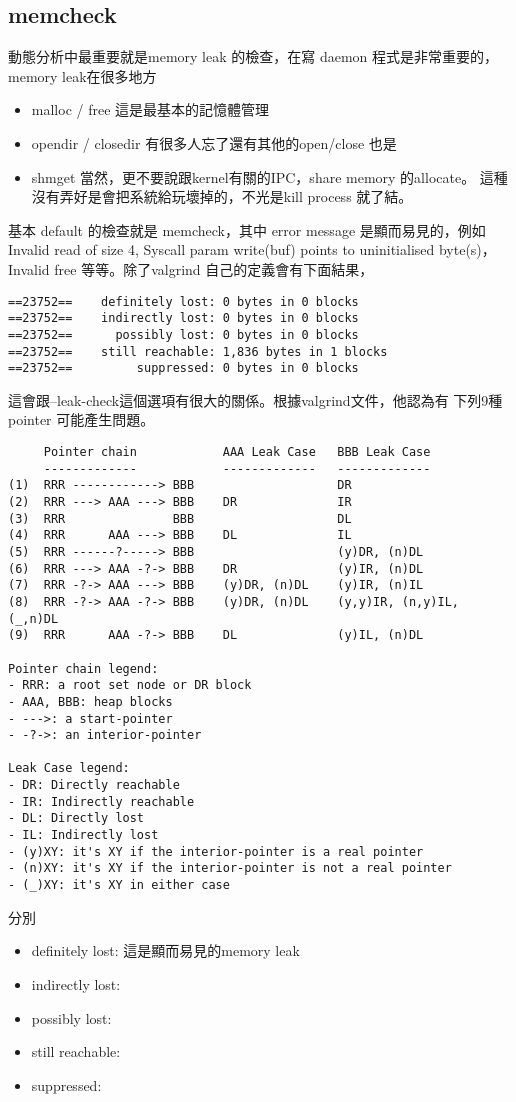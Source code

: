     \subsection{memcheck}
    動態分析中最重要就是memory leak 的檢查，在寫 daemon 程式是非常重要的，
    memory leak在很多地方
    \begin{itemize}
      \item malloc / free 這是最基本的記憶體管理
      \item opendir / closedir 有很多人忘了還有其他的open/close 也是
      \item shmget 當然，更不要說跟kernel有關的IPC，share memory 的allocate。
        這種沒有弄好是會把系統給玩壞掉的，不光是kill process 就了結。
    \end{itemize}
    基本 default 的檢查就是 memcheck，其中 error message 是顯而易見的，例如
    Invalid read of size 4, Syscall param write(buf) points to uninitialised
    byte(s)，Invalid free 等等。除了valgrind 自己的定義會有下面結果，
    \begin{verbatim}
==23752==    definitely lost: 0 bytes in 0 blocks
==23752==    indirectly lost: 0 bytes in 0 blocks
==23752==      possibly lost: 0 bytes in 0 blocks
==23752==    still reachable: 1,836 bytes in 1 blocks
==23752==         suppressed: 0 bytes in 0 blocks
    \end{verbatim}
    這會跟--leak-check這個選項有很大的關係。根據valgrind文件，他認為有
    下列9種pointer 可能產生問題。
    \begin{verbatim}
     Pointer chain            AAA Leak Case   BBB Leak Case
     -------------            -------------   -------------
(1)  RRR ------------> BBB                    DR
(2)  RRR ---> AAA ---> BBB    DR              IR
(3)  RRR               BBB                    DL
(4)  RRR      AAA ---> BBB    DL              IL
(5)  RRR ------?-----> BBB                    (y)DR, (n)DL
(6)  RRR ---> AAA -?-> BBB    DR              (y)IR, (n)DL
(7)  RRR -?-> AAA ---> BBB    (y)DR, (n)DL    (y)IR, (n)IL
(8)  RRR -?-> AAA -?-> BBB    (y)DR, (n)DL    (y,y)IR, (n,y)IL, (_,n)DL
(9)  RRR      AAA -?-> BBB    DL              (y)IL, (n)DL

Pointer chain legend:
- RRR: a root set node or DR block
- AAA, BBB: heap blocks
- --->: a start-pointer
- -?->: an interior-pointer

Leak Case legend:
- DR: Directly reachable
- IR: Indirectly reachable
- DL: Directly lost
- IL: Indirectly lost
- (y)XY: it's XY if the interior-pointer is a real pointer
- (n)XY: it's XY if the interior-pointer is not a real pointer
- (_)XY: it's XY in either case
    \end{verbatim}
    分別
    \begin{itemize}
      \item definitely lost: 這是顯而易見的memory leak
      \item indirectly lost: 
      \item possibly lost:
      \item still reachable:
      \item suppressed:
    \end{itemize}

